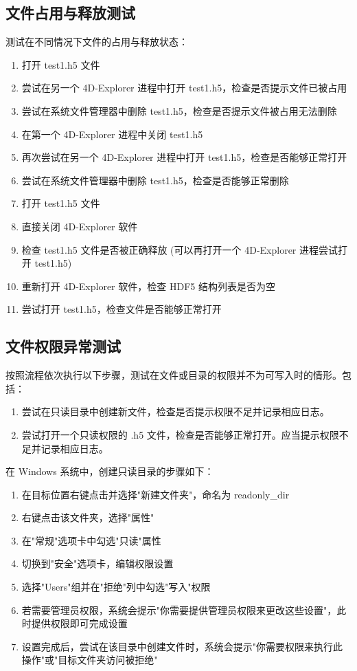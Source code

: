 \documentclass[a4paper,12pt]{report}	%
\begin{document}
\subsection{文件占用与释放测试}
测试在不同情况下文件的占用与释放状态：

\begin{enumerate}
    \item 打开 test1.h5 文件
    \item 尝试在另一个 4D-Explorer 进程中打开 test1.h5，检查是否提示文件已被占用
    \item 尝试在系统文件管理器中删除 test1.h5，检查是否提示文件被占用无法删除
    \item 在第一个 4D-Explorer 进程中关闭 test1.h5
    \item 再次尝试在另一个 4D-Explorer 进程中打开 test1.h5，检查是否能够正常打开
    \item 尝试在系统文件管理器中删除 test1.h5，检查是否能够正常删除
    \item 打开 test1.h5 文件
    \item 直接关闭 4D-Explorer 软件
    \item 检查 test1.h5 文件是否被正确释放 (可以再打开一个 4D-Explorer 进程尝试打开 test1.h5)
    \item 重新打开 4D-Explorer 软件，检查 HDF5 结构列表是否为空
    \item 尝试打开 test1.h5，检查文件是否能够正常打开
\end{enumerate}

\subsection{文件权限异常测试}

按照流程依次执行以下步骤，测试在文件或目录的权限并不为可写入时的情形。包括：
\begin{enumerate}
    \item 尝试在只读目录中创建新文件，检查是否提示权限不足并记录相应日志。
    \item 尝试打开一个只读权限的 .h5 文件，检查是否能够正常打开。应当提示权限不足并记录相应日志。
\end{enumerate}

在 Windows 系统中，创建只读目录的步骤如下：
\begin{enumerate}
    \item 在目标位置右键点击并选择"新建文件夹"，命名为 readonly\_dir
    \item 右键点击该文件夹，选择"属性"
    \item 在"常规"选项卡中勾选"只读"属性
    \item 切换到"安全"选项卡，编辑权限设置
    \item 选择"Users"组并在"拒绝"列中勾选"写入"权限
    \item 若需要管理员权限，系统会提示"你需要提供管理员权限来更改这些设置"，此时提供权限即可完成设置
    \item 设置完成后，尝试在该目录中创建文件时，系统会提示"你需要权限来执行此操作"或"目标文件夹访问被拒绝"
\end{enumerate}
\end{document}

